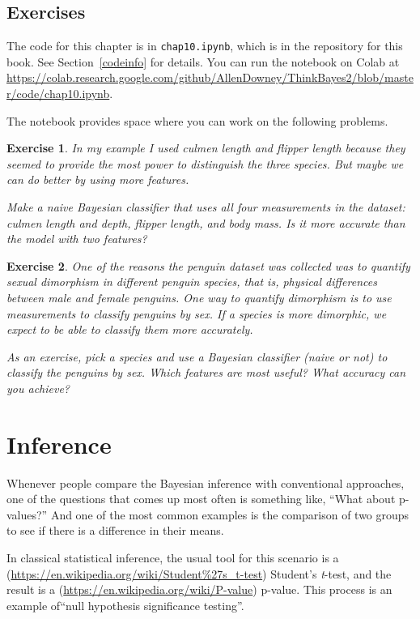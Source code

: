 \documentclass[12pt]{book}
\theoremstyle{exercise}
\newtheorem{exercise}{Exercise}[chapter]
\newcommand{\py}[1]{{\tt #1}}%
\begin{document}
\section{Exercises}

The code for this chapter is in \py{chap10.ipynb}, which is in the repository for this book.  See Section~\ref{codeinfo} for details.
You can run the notebook on Colab at \url{https://colab.research.google.com/github/AllenDowney/ThinkBayes2/blob/master/code/chap10.ipynb}.

The notebook provides space where you can work on the following problems.

\begin{exercise} In my example I used culmen length and flipper length
because they seemed to provide the most power to distinguish the three
species. But maybe we can do better by using more features.

Make a naive Bayesian classifier that uses all four measurements in the
dataset: culmen length and depth, flipper length, and body mass. Is it
more accurate than the model with two features?

\end{exercise}


\begin{exercise}

One of the reasons the penguin dataset was collected
was to quantify sexual dimorphism in different penguin species, that is,
physical differences between male and female penguins. One way to
quantify dimorphism is to use measurements to classify penguins by sex.
If a species is more dimorphic, we expect to be able to classify them
more accurately.

As an exercise, pick a species and use a Bayesian classifier (naive or
not) to classify the penguins by sex. Which features are most useful?
What accuracy can you achieve?
\end{exercise}


\chapter{Inference}

Whenever people compare the Bayesian inference with conventional
approaches, one of the questions that comes up most often is something
like, ``What about p-values?'' And one of the most common examples is
the comparison of two groups to see if there is a difference in their
means.

In classical statistical inference, the usual tool for this scenario is
a (\url{https://en.wikipedia.org/wiki/Student\%27s_t-test}) Student's
\textit{t}-test, and the result is a
(\url{https://en.wikipedia.org/wiki/P-value}) p-value. This process is
an example of``null
hypothesis significance testing''.
\end{document}
